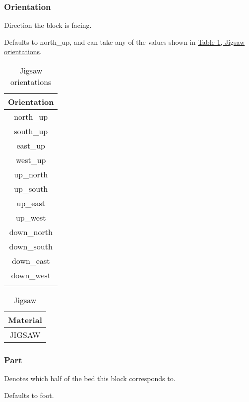 \subsubsection{Orientation}
Direction the block is facing.

Defaults to north\_up, and can take any of the values shown in \hyperref[ab:jigsaw]{Table \ref{ab:jigsaw}, Jigsaw orientations}.

\begin{longtable}{ |c| }
	\hline
	Orientation \\
	\hline
	\endhead
	north\_up \\
	south\_up \\
	east\_up \\
	west\_up \\
	\hline
	up\_north \\
	up\_south \\
	up\_east \\
	up\_west \\
	\hline
	down\_north \\
	down\_south \\
	down\_east \\
	down\_west \\
	\hline
	\caption{Jigsaw orientations}
	\label{ab:jigsaw}
\end{longtable}

\begin{table}[H]
	\centering
	\begin{tabular}{ |c| }
		\hline
		Material \\
		\hline
		JIGSAW \\
		\hline
	\end{tabular}
	\caption{Jigsaw}
\end{table}

\subsubsection{Part}
Denotes which half of the bed this block corresponds to.

Defaults to foot.

